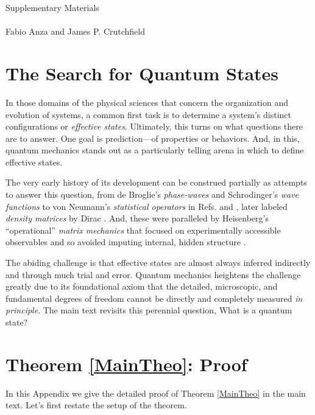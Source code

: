 \documentclass[nofootinbib,pre,twocolumn,showpacs,showkeys,groupaddress,preprintnumbers,floatfix]{revtex4-1}
\newcommand{\1}{\mathbbm{1}}
\begin{document}
\begin{center}
\large{Supplementary Materials}\\
\vspace{0.1in}
\emph{\ourTitle}\\
\vspace{0.1in}
{\small
Fabio Anza and James P. Crutchfield
}
\end{center}

\section{The Search for Quantum States}
\label{sm:QStates}

In those domains of the physical sciences that concern the organization and
evolution of systems, a common first task is to determine a system's distinct
configurations or \emph{effective states}. Ultimately, this turns on what
questions there are to answer. One goal is prediction---of properties or
behaviors. And, in this, quantum mechanics stands out as a particularly telling
arena in which to define effective states.

The very early history of its development can be construed partially as
attempts to answer this question, from de Broglie's \emph{phase-waves}
\cite{Brog25a} and Schrodinger's \emph{wave functions} \cite{Schr26a} to von
Neumann's \emph{statistical operators} in Refs. \cite{Neum27a} and \cite[Chap.
IV]{Neum32a}, later labeled \emph{density matrices} by Dirac
\cite{Dira29a,Dira30b,Dira31a}. And, these were paralleled by Heisenberg's
``operational'' \emph{matrix mechanics} that focused on experimentally
accessible observables and so avoided imputing internal, hidden structure
\cite{Heis25a}.

The abiding challenge is that effective states are almost always inferred
indirectly and through much trial and error. Quantum mechanics heightens the
challenge greatly due to its foundational axiom that the detailed, microscopic,
and fundamental degrees of freedom cannot be directly and completely measured
\emph{in principle}. The main text revisits this perennial question, What is a
quantum state?

\section{Theorem \ref{MainTheo}: Proof}
\label{sm:MainTheo}

In this Appendix we give the detailed proof of Theorem \ref{MainTheo} in the main text. 
Let's first restate the setup of the theorem.
\end{document}
